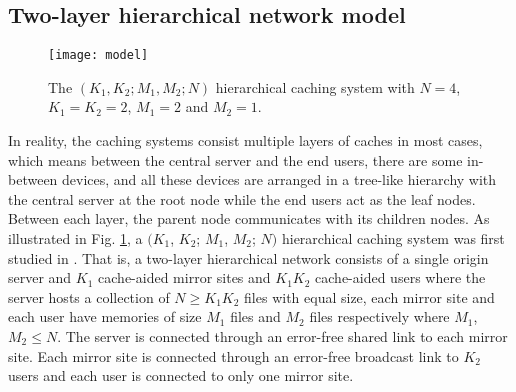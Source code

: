 \documentclass[onecolumn,10pt]{IEEEtran}
\theoremstyle{mythm}
\begin{document}
\subsection{Two-layer hierarchical network model}
\label{subsec:network-model}
\begin{figure}[http!]
\centering
\texttt{[image: model]}
\caption{The $(K_1,K_2;M_1,M_2;N)$ hierarchical  caching system with $N=4$, $K_1=K_2=2$, $M_1=2$ and $M_2=1$.}
\label{fig-model}
\end{figure}
In reality, the caching systems consist multiple layers of caches in most cases, which means between the central server and the end users, there are some in-between devices, and all these devices are arranged in a tree-like hierarchy with the central server at the root node while the end users act as the leaf nodes. Between each layer, the parent node communicates with its children nodes. As illustrated in Fig. \ref{fig-model}, a $(K_1$, $K_2$; $M_1$, $M_2$; $N)$ hierarchical caching system was first studied in \cite{KNMD}. That is, a two-layer hierarchical network consists of a single origin server and $K_1$ cache-aided mirror sites and $K_1K_2$ cache-aided users where the server hosts a collection of $N\geq K_1K_2$ files with equal size, each mirror site and each user have memories of size $M_1$ files and $M_2$ files respectively where $M_1$, $M_2\leq N$. The server is connected through an error-free shared link to each mirror site. Each mirror site is connected through an error-free broadcast link to $K_2$ users and each user is connected to only one mirror site.
\end{document}

